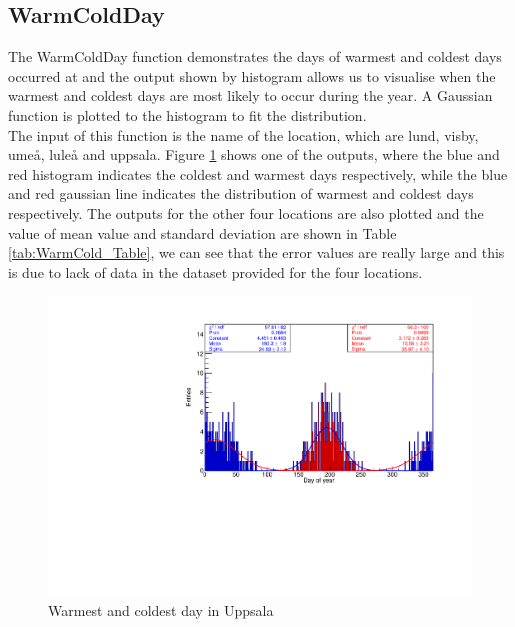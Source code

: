 \documentclass[a4paper,12pt]{article}
\begin{document}
\subsection{WarmColdDay}

The WarmColdDay function demonstrates the days of warmest and coldest days occurred at and the output shown by histogram allows us to visualise when the warmest and coldest days are most likely to occur during the year. A Gaussian function is plotted to the histogram to fit the distribution.\\

The input of this function is the name of the location, which are lund, visby, umeå, luleå and uppsala. Figure \ref{fig:WarmCold} shows one of the outputs, where the blue and red histogram indicates the coldest and warmest days respectively, while the blue and red gaussian line indicates the distribution of warmest and coldest days respectively. The outputs for the other four locations are also plotted and the value of mean value and standard deviation are shown in Table \ref{tab:WarmCold_Table}, we can see that the error values are really large and this is due to lack of data in the dataset provided for the four locations. 







\begin{figure}[h!]
    \centering
    \includegraphics[scale = 0.8]{uppsala.pdf}
    \caption{Warmest and coldest day in Uppsala}
    \label{fig:WarmCold}
\end{figure}
\end{document}
